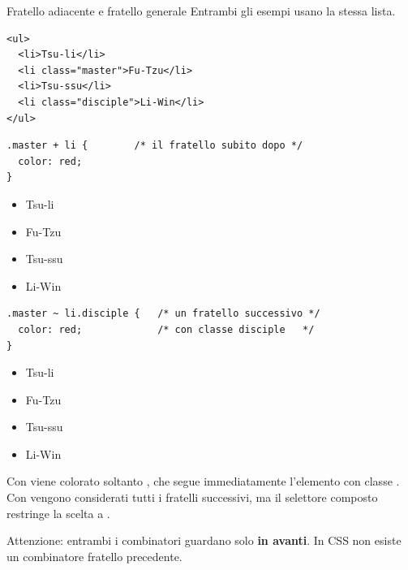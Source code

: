 \begin{esempio}{Fratello adiacente e fratello generale}
Entrambi gli esempi usano la stessa lista.

\begin{affianco}[0.5]
\begin{lstlisting}[style=html, name=fratelli.html]
<ul>
  <li>Tsu-li</li>
  <li class="master">Fu-Tzu</li>
  <li>Tsu-ssu</li>
  <li class="disciple">Li-Win</li>
</ul>
\end{lstlisting}
\begin{lstlisting}[style=css, name=adiacente.css]
.master + li {        /* il fratello subito dopo */
  color: red;
}
\end{lstlisting}
\risultato
\begin{browser}
  \begin{itemize}[leftmargin=1.8em, itemsep=0pt, topsep=0pt, parsep=0pt]
    \item Tsu-li
    \item Fu-Tzu
    \item \textcolor{css-red}{Tsu-ssu}
    \item Li-Win
  \end{itemize}
\end{browser}
\end{affianco}

\begin{affianco}[0.5]
\begin{lstlisting}[style=css, name=generale.css]
.master ~ li.disciple {   /* un fratello successivo */
  color: red;             /* con classe disciple   */
}
\end{lstlisting}
\risultato
\begin{browser}
  \begin{itemize}[leftmargin=1.8em, itemsep=0pt, topsep=0pt, parsep=0pt]
    \item Tsu-li
    \item Fu-Tzu
    \item Tsu-ssu
    \item \textcolor{css-red}{Li-Win}
  \end{itemize}
\end{browser}
\end{affianco}

Con \code{+} viene colorato soltanto , che segue immediatamente
l'elemento con classe . Con \code{\textasciitilde} vengono
considerati tutti i fratelli successivi, ma il selettore composto
 restringe la scelta a .

Attenzione: entrambi i combinatori guardano solo \textbf{in avanti}. In CSS non
esiste un combinatore \guillemotleft fratello precedente\guillemotright.
\end{esempio}


